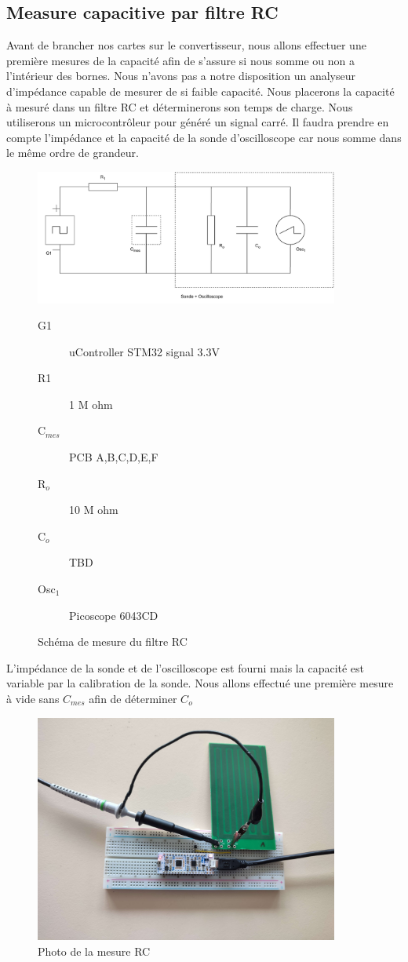 \newpage

\subsection{Measure capacitive par filtre RC}

Avant de brancher nos cartes sur le convertisseur, nous allons effectuer une première mesures de la capacité afin de s'assure si nous somme ou non a l'intérieur des bornes. Nous n'avons pas a notre disposition un analyseur d’impédance capable de mesurer de si faible capacité. Nous placerons la capacité à mesuré dans un filtre RC et déterminerons son temps de charge. Nous utiliserons un microcontrôleur pour généré un signal carré. Il faudra prendre en compte l’impédance et la capacité de la sonde d'oscilloscope car nous somme dans le même ordre de grandeur.


\begin{figure}[!ht]
\centering
 \includegraphics[width=10cm]{schemaMesure.pdf}
 \begin{description}
 \item[G1] uController STM32 signal 3.3V
 \item[R1] 1 M ohm
 \item[C$_{mes}$] PCB A,B,C,D,E,F
 \item[R$_o$] 10 M ohm
 \item[C$_o$] TBD
 \item[Osc$_1$] Picoscope 6043CD
\end{description}
 \caption{Schéma de mesure du filtre RC}
\end{figure}

L'impédance de la sonde et de l'oscilloscope est fourni mais la capacité est variable par la calibration de la sonde. Nous allons effectué une première mesure à vide sans $C_{mes}$ afin de déterminer $C_o$


\begin{figure}[!ht]
\centering
 \includegraphics[width=10cm]{RCPhoto.jpg}
 \caption{Photo de la mesure RC}
\end{figure}

